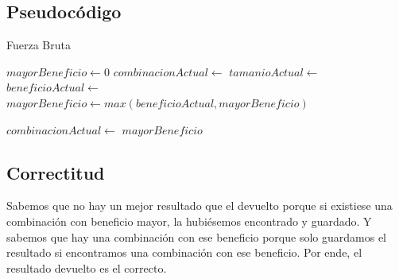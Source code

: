\documentclass[10pt, a4paper]{article}
\begin{document}
\subsection{Pseudocódigo}
\pagebreak
\begin{algorithm}
\caption{Fuerza Bruta}
\begin{algorithmic}[1]
	\State $mayorBeneficio \gets 0$
	\State $combinacionActual \gets $
		\State $tamanioActual \gets $
			\State $beneficioActual \gets $
			\State $mayorBeneficio \gets max(beneficioActual, mayorBeneficio)$
		\EndIf

		\State $combinacionActual \gets $
	\EndWhile
	\State \Return $mayorBeneficio$
\EndFunction
\end{algorithmic}
\end{algorithm}

\subsection{Correctitud}
Sabemos que no hay un mejor resultado que el devuelto porque si existiese una combinación con beneficio mayor, la hubiésemos encontrado y guardado. Y sabemos que hay una combinación con ese beneficio porque solo guardamos el resultado si encontramos una combinación con ese beneficio. Por ende, el resultado devuelto es el correcto. \par
\end{document}
